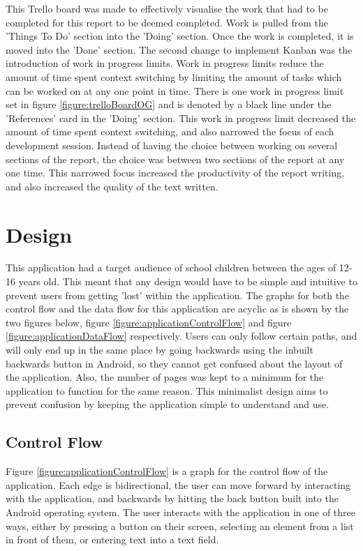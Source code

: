 \documentclass{article}
\begin{document}
This Trello board was made to effectively visualise the work that had to be completed for this report to be deemed completed. Work is pulled from the 'Things To Do' section into the 'Doing' section. Once the work is completed, it is moved into the 'Done' section. The second change to implement Kanban was the introduction of work in progress limits. Work in progress limits reduce the amount of time spent context switching by limiting the amount of tasks which can be worked on at any one point in time. There is one work in progress limit set in figure \ref{figure:trelloBoardOG} and is denoted by a black line under the 'References' card in the 'Doing' section. This work in progress limit decreased the amount of time spent context switching, and also narrowed the focus of each development session. Instead of having the choice between working on several sections of the report, the choice was between two sections of the report at any one time. This narrowed focus increased the productivity of the report writing, and also increased the quality of the text written. 


\section{Design}
\label{section:design}

This application had a target audience of school children between the ages of 12-16 years old. This meant that any design would have to be simple and intuitive to prevent users from getting 'lost' within the application. The graphs for both the control flow and the data flow for this application are acyclic as is shown by the two figures below, figure \ref{figure:applicationControlFlow} and figure \ref{figure:applicationDataFlow} respectively. Users can only follow certain paths, and will only end up in the same place by going backwards using the inbuilt backwards button in Android, so they cannot get confused about the layout of the application. Also, the number of pages was kept to a minimum for the application to function for the same reason. This minimalist design aims to prevent confusion by keeping the application simple to understand and use. \par

\subsection{Control Flow}

Figure \ref{figure:applicationControlFlow} is a graph for the control flow of the application. Each edge is bidirectional, the user can move forward by interacting with the application, and backwards by hitting the back button built into the Android operating system. The user interacts with the application in one of three ways, either by pressing a button on their screen, selecting an element from a list in front of them, or entering text into a text field. \par
\end{document}
